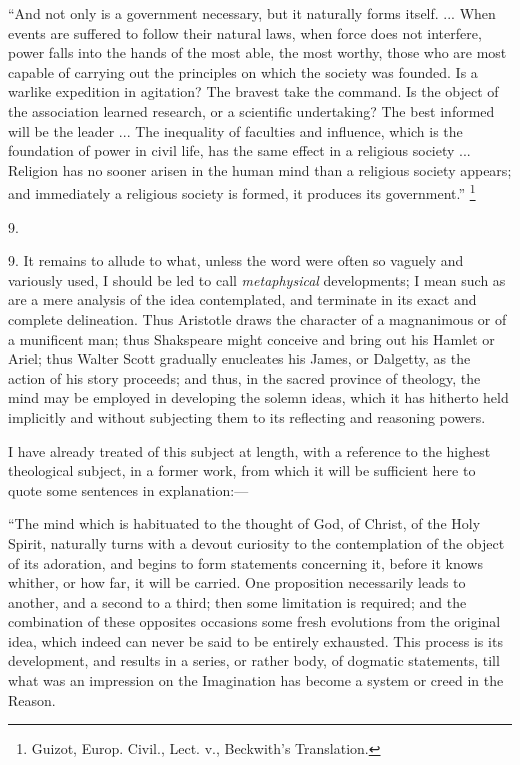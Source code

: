 ``And not only is a government necessary, but it
naturally forms itself. ... When events are suffered to
follow their natural laws, when force does not interfere,
power falls into the hands of the most able, the most
worthy, those who are most capable of carrying out the
principles on which the society was founded. Is a warlike
expedition in agitation? The bravest take the command. Is
the object of the association learned research, or a
scientific undertaking? The best informed will be the
leader ... The inequality of faculties and influence,
which is the foundation of power in civil life, has the
same effect in a religious society ... Religion has no
sooner arisen in the human mind than a religious society
appears; and immediately a religious society is formed,
it produces its government.'' \footnote{Guizot, Europ. Civil., Lect.
v., Beckwith's Translation.}

9.

9. It remains to allude to what, unless the word were
often so vaguely and variously used, I should be led to
call \emph{metaphysical} developments; I mean such as are
a mere analysis of the idea contemplated, and terminate
in its exact and complete delineation. Thus Aristotle
draws the character of a magnanimous or of a munificent
man; thus Shakspeare might conceive and bring out his
Hamlet or Ariel; thus Walter Scott gradually enucleates
his James, or Dalgetty, as the action of his story
proceeds; and thus, in the sacred province of theology,
the mind may be employed in developing the solemn ideas,
which it has hitherto held implicitly and without
subjecting them to its reflecting and reasoning powers.

I have already treated of this subject at length, with
a reference to the highest theological subject, in a
former work, from which it will be sufficient here to
quote some sentences in explanation:—

``The mind which is habituated to the thought of
God, of Christ, of the Holy Spirit, naturally turns with
a devout curiosity to the contemplation of the object of
its adoration, and begins to form statements concerning
it, before it knows whither, or how far, it will be
carried. One proposition necessarily leads to another,
and a second to a third; then some limitation is
required; and the combination of these opposites
occasions some fresh evolutions from the original idea,
which indeed can never be said to be entirely exhausted.
This process is its development, and results in a series,
or rather body, of dogmatic statements, till what was an
impression on the Imagination has become a system or
creed in the Reason.

